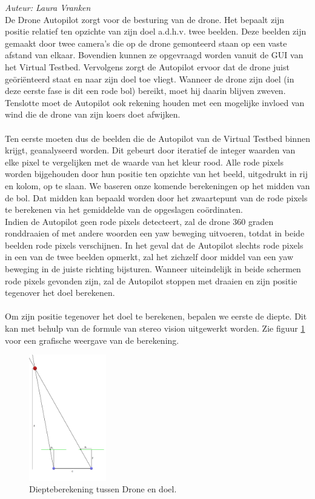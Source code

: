 {\em Auteur: Laura Vranken}\\

\noindent
De Drone Autopilot zorgt voor de besturing van de drone. Het bepaalt zijn positie relatief ten opzichte van zijn doel a.d.h.v. twee beelden. Deze beelden zijn gemaakt door twee camera's die op de drone gemonteerd staan op een vaste afstand van elkaar. Bovendien kunnen ze opgevraagd worden vanuit de GUI van het Virtual Testbed. Vervolgens zorgt de Autopilot ervoor dat de drone juist ge\"ori\"enteerd staat en naar zijn doel toe vliegt. Wanneer de drone zijn doel (in deze eerste fase is dit een rode bol) bereikt, moet hij daarin blijven zweven. Tenslotte moet de Autopilot ook rekening houden met een mogelijke invloed van wind die de drone van zijn koers doet afwijken.
\\
\\
Ten eerste moeten dus de beelden die de Autopilot van de Virtual Testbed binnen krijgt, geanalyseerd worden. Dit gebeurt door iteratief de integer waarden van elke pixel te vergelijken met de waarde van het kleur rood. Alle rode pixels worden bijgehouden door hun positie ten opzichte van het beeld, uitgedrukt in rij en kolom, op te slaan. We baseren onze komende berekeningen op het midden van de bol. Dat midden kan bepaald worden door het zwaartepunt van de rode pixels te berekenen via het gemiddelde van de opgeslagen co\"ordinaten.
\\
Indien de Autopilot geen rode pixels detecteert, zal de drone 360 graden ronddraaien of met andere woorden een yaw beweging uitvoeren, totdat in beide beelden rode pixels verschijnen. In het geval dat de Autopilot slechts rode pixels in een van de twee beelden opmerkt, zal het zichzelf door middel van een yaw beweging in de juiste richting bijsturen. Wanneer uiteindelijk in beide schermen rode pixels gevonden zijn, zal de Autopilot stoppen met draaien en zijn positie tegenover het doel berekenen.
\\
\\
Om zijn positie tegenover het doel te berekenen, bepalen we eerste de diepte. Dit kan met behulp van de formule van stereo vision \cite{website:techbriefs} uitgewerkt worden. Zie figuur \ref{fig:DiepteberekeningDroneEnDoel} voor een grafische weergave van de berekening.
\begin{figure}[h]
	\centering
	\includegraphics[width=0.3\textwidth]{DiepteberekeningDroneEnDoel.png}
	\caption{Diepteberekening tussen Drone en doel.}
	\label{fig:DiepteberekeningDroneEnDoel}
\end{figure}
